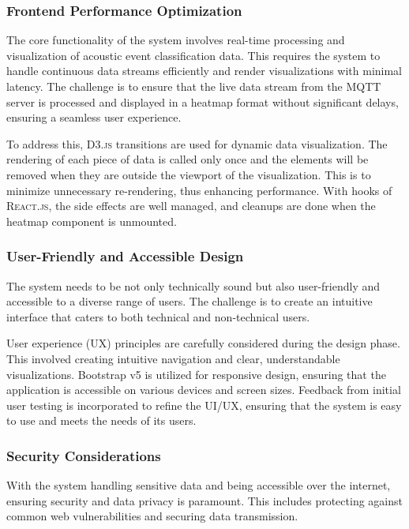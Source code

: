 \subsubsection{Frontend Performance Optimization}
The core functionality of the system involves real-time processing and visualization of acoustic event classification data. This requires the system to handle continuous data streams efficiently and render visualizations with minimal latency. The challenge is to ensure that the live data stream from the MQTT server is processed and displayed in a heatmap format without significant delays, ensuring a seamless user experience.

To address this, \textsc{D3.js} transitions are used for dynamic data visualization. The rendering of each piece of data is called only once and the elements will be removed when they are outside the viewport of the visualization. This is to minimize unnecessary re-rendering, thus enhancing performance. With hooks of \textsc{React.js}, the side effects are well managed, and cleanups are done when the heatmap component is unmounted.

\subsubsection{User-Friendly and Accessible Design}
The system needs to be not only technically sound but also user-friendly and accessible to a diverse range of users. The challenge is to create an intuitive interface that caters to both technical and non-technical users.

User experience (UX) principles are carefully considered during the design phase. This involved creating intuitive navigation and clear, understandable visualizations. Bootstrap v5 is utilized for responsive design, ensuring that the application is accessible on various devices and screen sizes.
Feedback from initial user testing is incorporated to refine the UI/UX, ensuring that the system is easy to use and meets the needs of its users.

\subsubsection{Security Considerations}
With the system handling sensitive data and being accessible over the internet, ensuring security and data privacy is paramount. This includes protecting against common web vulnerabilities and securing data transmission.

